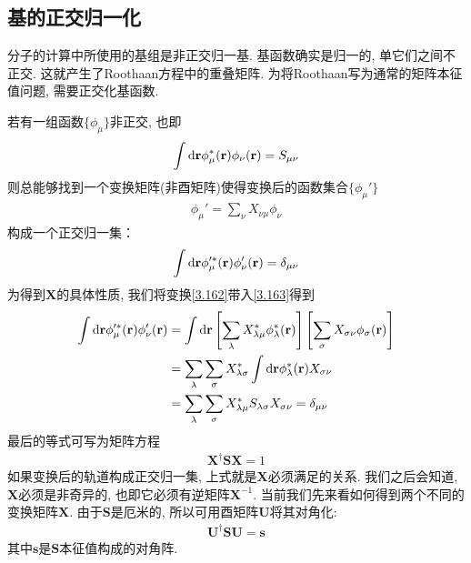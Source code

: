 \subsection{基的正交归一化}
分子的计算中所使用的基组是非正交归一基. 
基函数确实是归一的, 
单它们之间不正交. 
这就产生了Roothaan方程中的重叠矩阵. 
为将Roothaan写为通常的矩阵本征值问题, 
需要正交化基函数.


若有一组函数$\{\phi_\mu\}$非正交, 
也即
\begin{align}
	\int\dd{r}\phi_\mu^*(\bfr)\phi_\nu(\bfr) = S_{\mu\nu}
\end{align}
则总能够找到一个变换矩阵(非酉矩阵)使得变换后的函数集合$\{\phi_\mu'\}$
\begin{align}\label{3.162}
	\phi_\mu' = \sum_{\nu}X_{\nu\mu}\phi_\nu
\end{align}
构成一个正交归一集：
\begin{align}
	\label{3.163}
	\int\dd{r}\phi_\mu^{\prime*}(\bfr)\phi_\nu'(\bfr) = \delta_{\mu\nu}
\end{align}
为得到$\mathbf{X}$的具体性质, 
我们将变换\autoref{3.162}带入\autoref{3.163}得到
\begin{align}
	\int\dd{r}\phi_\mu^{\prime *}(\bfr)\phi_\nu^{\prime}(\bfr) & = \int\dd{r}\left[ \sum_{\lambda}X_{\lambda\mu}^*\phi_{\lambda}^*(\bfr)\right]\left[ \sum_\sigma X_{\sigma\nu}\phi_\sigma(\bfr) \right]\notag\\
	& = \sum_\lambda\sum_\sigma X_{\lambda\sigma}^*\int\dd{r}\phi_\lambda^*(\bfr)X_{\sigma\nu}\notag\\
	& = \sum_\lambda\sum_\sigma X_{\lambda\mu}^*S_{\lambda\sigma}X_{\sigma\nu} = \delta_{\mu\nu}
\end{align}
最后的等式可写为矩阵方程
\begin{align}\label{3.165}
	\mathbf{X^\dagger SX}=1
\end{align}
如果变换后的轨道构成正交归一集, 
上式就是$\mathbf{X}$必须满足的关系. 
我们之后会知道, 
$\mathbf{X}$必须是非奇异的, 
也即它必须有逆矩阵$\mathbf{X}^{-1}$. 
当前我们先来看如何得到两个不同的变换矩阵$\mathbf{X}$. 
由于$\mathbf{S}$是厄米的, 
所以可用酉矩阵$\mathbf{U}$将其对角化:
\begin{align}
	\mathbf{U^\dagger SU=s}
\end{align} 
其中$\mathbf{s}$是$\mathbf{S}$本征值构成的对角阵.


